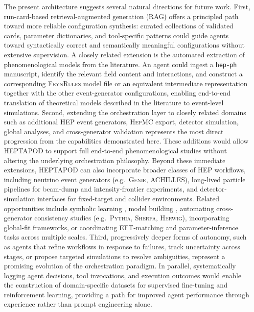 \documentclass[11pt,oneside]{article}
\numberwithin{equation}{section}
\newcommand{\pkgname}{HEPTAPOD\xspace}
\begin{document}
The present architecture suggests several natural directions for future work.
First, run-card-based retrieval-augmented generation (RAG) offers a principled path toward more reliable configuration synthesis: curated collections of validated cards, parameter dictionaries, and tool-specific patterns could guide agents toward syntactically correct and semantically meaningful configurations without extensive supervision. 
A closely related extension is the automated extraction of phenomenological models from the literature. An agent could ingest a \texttt{hep-ph} manuscript, identify the relevant field content and interactions, and construct a corresponding \textsc{FeynRules} model file or an equivalent intermediate representation together with the other event-generator configurations, enabling end-to-end translation of theoretical models described in the literature to event-level simulations.
Second, extending the orchestration layer to closely related domains such as additional HEP event generators, \textsc{HepMC} \cite{Buckley:2019xhk} export, detector simulation, global analyses, and cross-generator validation represents the most direct progression from the capabilities demonstrated here. 
These additions would allow \pkgname{} to support full end-to-end phenomenological studies without altering the underlying orchestration philosophy.
Beyond these immediate extensions, \pkgname can also incorporate broader classes of HEP workflows, including neutrino event generators (e.g.~\textsc{Genie}\cite{Andreopoulos:2009rq}, \textsc{ACHILLES}\cite{Isaacson:2022cwh}), long-lived particle pipelines for beam-dump and intensity-frontier experiments, and detector-simulation interfaces for fixed-target and collider environments. 
Related opportunities include symbolic learning \cite{Alnuqaydan:2022ncd,Dong:2022trn}, model building \cite{Matchev:2024ash,Wojcik:2024lfy,Kawai:2024pws,Koay:2025bmu}, automating cross-generator consistency studies (e.g.~\textsc{Pythia}, \textsc{Sherpa}, \textsc{Herwig}), incorporating global-fit frameworks, or coordinating EFT-matching and parameter-inference tasks across multiple scales.
Third, progressively deeper forms of autonomy, such as agents that refine workflows in response to failures, track uncertainty across stages, or propose targeted simulations to resolve ambiguities, represent a promising evolution of the orchestration paradigm. In parallel, systematically logging agent decisions, tool invocations, and execution outcomes would enable the construction of domain-specific datasets for supervised fine-tuning and reinforcement learning, providing a path for improved agent performance through experience rather than prompt engineering alone. 
\end{document}
